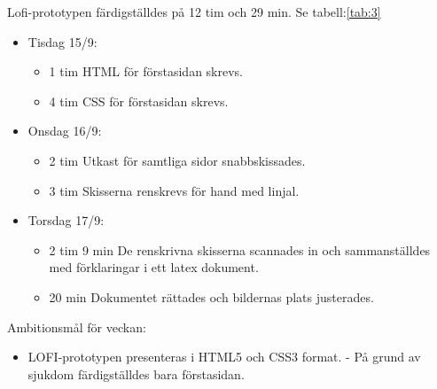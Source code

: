 \documentclass{TDP003mall}
\begin{document}
Lofi-prototypen färdigställdes på 12 tim och 29 min. Se tabell:\ref{tab:3}
\begin{itemize}
  \item Tisdag 15/9:
  \begin{itemize}
    \item 1 tim HTML för förstasidan skrevs.
    \item 4 tim CSS för förstasidan skrevs.
  \end{itemize}
  \item Onsdag 16/9:
  \begin{itemize}
    \item 2 tim Utkast för samtliga sidor snabbskissades.
    \item 3 tim Skisserna renskrevs för hand med linjal.
  \end{itemize}
  \item Torsdag 17/9:
  \begin{itemize}
    \item 2 tim 9 min De renskrivna skisserna scannades in och sammanställdes med förklaringar i ett latex dokument.
    \item 20 min Dokumentet rättades och bildernas plats justerades.
  \end{itemize}
\end{itemize}


Ambitionsmål för veckan:
\begin{itemize}
  \item LOFI-prototypen presenteras i HTML5 och CSS3 format. - På grund av sjukdom färdigställdes bara förstasidan.
  \end{itemize}
  



  
\end{document}
